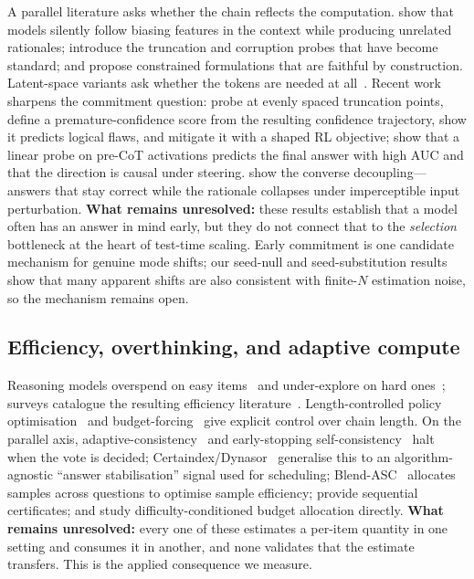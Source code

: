 A parallel literature asks whether the chain reflects the computation.
\citet{turpin2023unfaithful} show that models silently follow biasing features
in the context while producing unrelated rationales;
\citet{lanham2023measuring} introduce the truncation and corruption probes that
have become standard; and \citet{lyu2023faithful} propose constrained
formulations that are faithful by construction. Latent-space variants ask
whether the tokens are needed at
all~\citep{hao2024coconut,pfau2024filler,goyal2024pause}. Recent work sharpens
the commitment question: \citet{prematureconfidence2026} probe at evenly spaced
truncation points, define a premature-confidence score from the resulting
confidence trajectory, show it predicts logical flaws, and mitigate it with a
shaped RL objective; \citet{precotprobe2026} show that a linear probe on
pre-CoT activations predicts the final answer with high AUC and that the
direction is causal under steering. \citet{matcha2025} show the converse
decoupling---answers that stay correct while the rationale collapses under
imperceptible input perturbation. \textbf{What remains unresolved:} these
results establish that a model often has an answer in mind early, but they do
not connect that to the \emph{selection} bottleneck at the heart of test-time
scaling. Early commitment is one candidate mechanism for genuine mode shifts;
our seed-null and seed-substitution results show that many apparent shifts are
also consistent with finite-$N$ estimation noise, so the mechanism remains open.

\subsection{Efficiency, overthinking, and adaptive compute}

Reasoning models overspend on easy items~\citep{overthinking2024} and
under-explore on hard ones~\citep{underthinking2025}; surveys catalogue the
resulting efficiency
literature~\citep{stopoverthinking2025}. Length-controlled policy
optimisation~\citep{l1_2025} and budget-forcing~\citep{muennighoff2025s1} give
explicit control over chain length. On the parallel axis,
adaptive-consistency~\citep{aggarwal2023adaptive} and early-stopping
self-consistency~\citep{li2024esc} halt when the vote is decided;
Certaindex/Dynasor~\citep{fu2024certaindex} generalise this to an
algorithm-agnostic ``answer stabilisation'' signal used for scheduling;
Blend-ASC~\citep{blendasc2025} allocates samples across questions to optimise
sample efficiency; \citet{certifiedsc2025} provide sequential certificates; and
\citet{adaptivettc2026} study difficulty-conditioned budget allocation directly.
\textbf{What remains unresolved:} every one of these estimates a per-item
quantity in one setting and consumes it in another, and none validates that the
estimate transfers. This is the applied consequence we measure.

